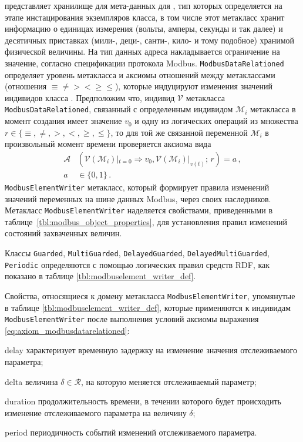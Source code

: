 \mbdata представляет хранилище для мета-данных для \mbelement, тип которых определяется на этапе инстацирования экземпляров класса,
в том числе этот метакласс хранит информацию о единицах измерения (вольты, амперы, секунды и так далее) и десятичных приставках (мили-, деци-, санти-, кило- и тому подобное)
хранимой физической величины.
На тип данных адреса накладывается ограничение на значение, согласно спецификации протокола Modbus.
%
\texttt{ModbusDataRelationed} определяет уровень метакласса и аксиомы отношений между метаклассами \mbdata
    (отношения $\equiv \ne > < \ge \le$), которые индуцируют изменения значений индивидов класса \mbdata.
    Предположим что, индивид $\mathcal{V}$ метакласса \texttt{ModbusDataRelationed}, связанный с определенным
    индивидом $\mathcal{M}_i$ метакласса \mbdata в момент создания имеет значение $v_0$ и одну из логических операций из множества $r \in \{\equiv,\ne,>,<,\ge,\le\}$,
    то для той же связанной переменной $\mathcal{M}_i$ в произвольный момент времени проверяется аксиома вида 
    \begin{equation}\label{eq:axiom_modbusdatarelationed}
        \begin{split}
            \mathcal{A}&\left(\mathcal{V}(\mathcal{M}_i)|_{t=0}\Rightarrow v_0, \mathcal{V}(\mathcal{M}_i)|_{v(t)};\, r\right) = a\,, {}\\
            a& \in \{0, 1\}\,.
        \end{split}
    \end{equation}
%
\texttt{ModbusElementWriter} метакласс, который формирует правила изменений значений переменных на шине данных Modbus,
через своих наследников.
Метакласс \texttt{ModbusElementWriter} наделяется свойствами, приведенными в таблице~\ref{tbl:modbus_object_properties},
для установления правил изменений состояний захваченных величин.

Классы \texttt{Guarded}, \texttt{MultiGuarded}, \texttt{DelayedGuarded}, \texttt{DelayedMultiGuarded}, \texttt{Periodic}
определяются с помощью логических правил средств RDF, как показано в таблице \ref{tbl:modbuselement_writer_def}.

Свойства, относящиеся к домену метакласса \texttt{ModbusElementWriter}, упомянутые в таблице \ref{tbl:modbuselement_writer_def},
которые применяются к индивидам \texttt{ModbusElementWriter} после выполнения условий аксиомы выражения \eqref{eq:axiom_modbusdatarelationed}:
\begin{enumerate*}[label=\arabic*\upshape)]
    \item delay характеризует временную задержку на изменение значения отслеживаемого параметра;
    \item delta величина $\delta \in \mathcal{R}$, на которую меняется отслеживаемый параметр;
    \item duration продолжительность времени, в течении которого будет происходить изменение отслеживаемого параметра на величину $\delta$;
    \item period периодичность событий изменений отслеживаемого параметра.
\end{enumerate*}

